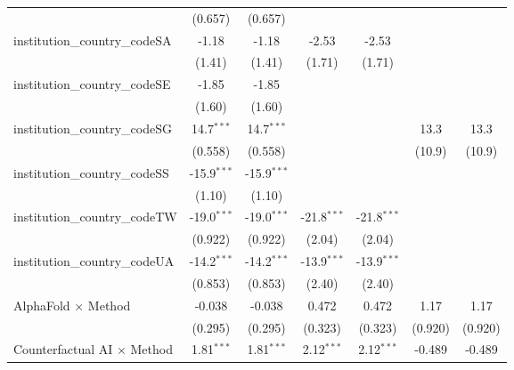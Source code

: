 \begin{tabular}{lcccccc}
                                         & (0.657)       & (0.657)       &               &               &               &   \\   
   institution\_country\_codeSA          & -1.18         & -1.18         & -2.53         & -2.53         &               &   \\   
                                         & (1.41)        & (1.41)        & (1.71)        & (1.71)        &               &   \\   
   institution\_country\_codeSE          & -1.85         & -1.85         &               &               &               &   \\   
                                         & (1.60)        & (1.60)        &               &               &               &   \\   
   institution\_country\_codeSG          & 14.7$^{***}$  & 14.7$^{***}$  &               &               & 13.3          & 13.3\\   
                                         & (0.558)       & (0.558)       &               &               & (10.9)        & (10.9)\\   
   institution\_country\_codeSS          & -15.9$^{***}$ & -15.9$^{***}$ &               &               &               &   \\   
                                         & (1.10)        & (1.10)        &               &               &               &   \\   
   institution\_country\_codeTW          & -19.0$^{***}$ & -19.0$^{***}$ & -21.8$^{***}$ & -21.8$^{***}$ &               &   \\   
                                         & (0.922)       & (0.922)       & (2.04)        & (2.04)        &               &   \\   
   institution\_country\_codeUA          & -14.2$^{***}$ & -14.2$^{***}$ & -13.9$^{***}$ & -13.9$^{***}$ &               &   \\   
                                         & (0.853)       & (0.853)       & (2.40)        & (2.40)        &               &   \\   
   AlphaFold $\times$ Method             & -0.038        & -0.038        & 0.472         & 0.472         & 1.17          & 1.17\\   
                                         & (0.295)       & (0.295)       & (0.323)       & (0.323)       & (0.920)       & (0.920)\\   
   Counterfactual AI $\times$ Method     & 1.81$^{***}$  & 1.81$^{***}$  & 2.12$^{***}$  & 2.12$^{***}$  & -0.489        & -0.489\\   

\end{tabular}
